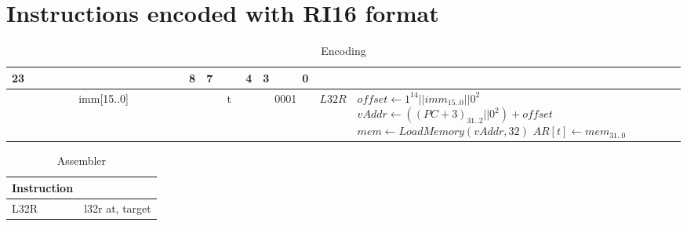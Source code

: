 \section{Instructions encoded with RI16 format}
	\begin{longtable}{llllllllllllllllllllllll  p{1cm}  p{7cm} | }
		\caption{Encoding\label{long}}\\
		23 & & & & & & & & & & & & & & & 8 & 7 & & & 4 & 3 & & & 0 & &
		\multicolumn{1}{c}{}\\
		\hline
		\multicolumn{16}{|c|}{imm[15..0]} & \multicolumn{4}{c|}{t} & \multicolumn{4}{c|}{0001} & \multicolumn{1}{c|}{$L32R$} & $offset \leftarrow 1^{14}||imm_{15..0}||0^2$ \newline $vAddr \leftarrow ((PC + 3)_{31..2}||0^2) + offset$ \newline $mem \leftarrow LoadMemory(vAddr, 32)$ \newline $AR[t] \leftarrow mem_{31..0}$\\ \hline
	\end{longtable}

	\begin{longtable}{|p{5cm}|p{5cm}|}
		\caption{Assembler\label{long}}\\
		\hline
		Instruction & \\
		\hline
		L32R & l32r at, target\\ \hline
	\end{longtable}

